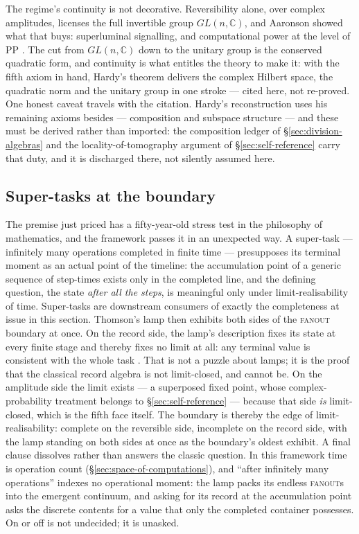 The regime's continuity is not decorative. Reversibility alone, over complex amplitudes, licenses
the full invertible group $GL(n, \mathbb{C})$, and Aaronson showed what that buys: superluminal
signalling, and computational power at the level of \textsf{PP} \autocite{Aaronson2004h}. The cut
from $GL(n, \mathbb{C})$ down to the unitary group is the conserved quadratic form, and continuity
is what entitles the theory to make it: with the fifth axiom in hand, Hardy's theorem delivers the
complex Hilbert space, the quadratic norm and the unitary group in one stroke \autocite{Hardy2001a}
--- cited here, not re-proved. One honest caveat travels with the citation. Hardy's reconstruction
uses his remaining axioms besides --- composition and subspace structure --- and these must be
derived rather than imported: the composition ledger of \S\ref{sec:division-algebras} and the
locality-of-tomography argument of \S\ref{sec:self-reference} carry that duty, and it is discharged
there, not silently assumed here.

\subsection{Super-tasks at the boundary}

The premise just priced has a fifty-year-old stress test in the philosophy of mathematics, and the
framework passes it in an unexpected way. A super-task --- infinitely many operations completed in
finite time \autocite{Thomson_1954} --- presupposes its terminal moment as an actual point of the
timeline: the accumulation point of a generic sequence of step-times exists only in the completed
line, and the defining question, the state \emph{after all the steps}, is meaningful only under
limit-realisability of time. Super-tasks are downstream consumers of exactly the completeness at
issue in this section. Thomson's lamp then exhibits both sides of the \textsc{fanout} boundary at
once. On the record side, the lamp's description fixes its state at every finite stage and thereby
fixes no limit at all: any terminal value is consistent with the whole task
\autocite{Thomson_1954,benacerraf1962tasks}. That is not a puzzle about lamps; it is the proof that
the classical record algebra is not limit-closed, and cannot be. On the amplitude side the limit
exists --- a superposed fixed point, whose complex-probability treatment belongs to
\S\ref{sec:self-reference} --- because that side \emph{is} limit-closed, which is the fifth face
itself. The boundary is thereby the edge of limit-realisability: complete on the reversible side,
incomplete on the record side, with the lamp standing on both sides at once as the boundary's oldest
exhibit. A final clause dissolves rather than answers the classic question. In this framework time
is operation count (\S\ref{sec:space-of-computations}), and ``after infinitely many operations''
indexes no operational moment: the lamp packs its endless \textsc{fanout}s into the emergent
continuum, and asking for its record at the accumulation point asks the discrete contents for a
value that only the completed container possesses. On or off is not undecided; it is unasked.

